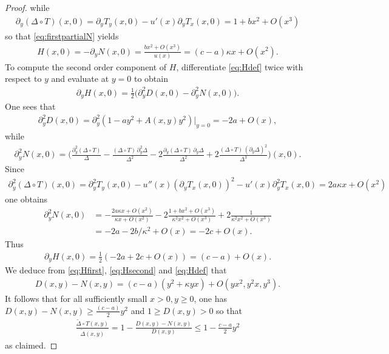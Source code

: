 \documentclass[10pt,a4paper]{amsart}
\begin{document}
\begin{proof}
    while
    \begin{align}
        \partial_y(\Delta\circ T)(x,0) = \partial_y T_y(x,0)-u'(x)\partial_yT_x(x,0) = 1+bx^2 + O(x^3)
    \end{align}
    so that \eqref{eq:firstpartialN} yields
    \begin{align}
        H(x,0) = -\partial_yN(x,0) = \frac{bx^2 + O(x^3)}{u(x)} = (c-a)\kappa x + O(x^2).\label{eq:Hfirst}
    \end{align}
    To compute the second order component of $H$, differentiate \eqref{eq:Hdef} twice with respect to $y$ and evaluate at $y=0$ to obtain
    \begin{align}
        \partial_yH(x,0) = \frac{1}{2}\big(\partial^2_yD(x,0)-\partial_y^2N(x,0)\big).\label{eq:partialH}
    \end{align}
    One sees that
    \begin{align}
        \partial^2_yD(x,0) = \partial^2_y(1-ay^2 + A(x,y)y^2)|_{y=0} = -2a+O(x),
    \end{align}
    while
    \begin{align}
        \partial^2_yN(x,0) = \bigg(\frac{\partial^2_y(\Delta\circ T)}{\Delta} - \frac{(\Delta\circ T)\,\partial^2_y\Delta}{\Delta^2} - 2\frac{\partial_y(\Delta\circ T)\,\partial_y\Delta}{\Delta^2} + 2\frac{(\Delta\circ T)\,(\partial_y\Delta)^2}{\Delta^3}\bigg)(x,0).
    \end{align}
    Since
    \begin{align}
        \partial^2_y(\Delta\circ T)(x,0) = \partial^2_yT_y(x,0) - u''(x)(\partial_yT_x(x,0))^2 - u'(x)\partial^2_yT_x(x,0) = 2a\kappa x+O(x^2)
    \end{align}
    one obtains
    \begin{align}
        \partial^2_yN(x,0) &= -\frac{2a\kappa x+O(x^2)}{\kappa x+O(x^2)}-2\frac{1+bx^2+O(x^3)}{\kappa^2x^2+O(x^3)} + 2\frac{1}{\kappa^2x^2 + O(x^3)}\\&=-2a-2b/\kappa^2 + O(x) = -2c+O(x).
    \end{align}
    Thus
    \begin{align}
        \partial_yH(x,0) = \frac{1}{2}(-2a+2c+O(x)) = (c-a)+O(x).\label{eq:Hsecond}
    \end{align}
    We deduce from \eqref{eq:Hfirst}, \eqref{eq:Hsecond} and \eqref{eq:Hdef} that
    \begin{align}
        D(x,y)-N(x,y) = (c-a)(y^2+\kappa yx) + O(yx^2,y^2x,y^3).
    \end{align}
    It follows that for all sufficiently small $x>0, y\geq0$, one has $D(x,y)-N(x,y)\geq \frac{(c-a)}{2}y^2$ and $1\geq D(x,y)>0$ so that
    \begin{align}
        \frac{\widetilde{\Delta}\circ T(x,y)}{\widetilde{\Delta}(x,y)} = 1-\frac{D(x,y)-N(x,y)}{D(x,y)}\leq 1-\frac{c-a}{2}y^2
    \end{align}
    as claimed.
\end{proof}
\end{document}
